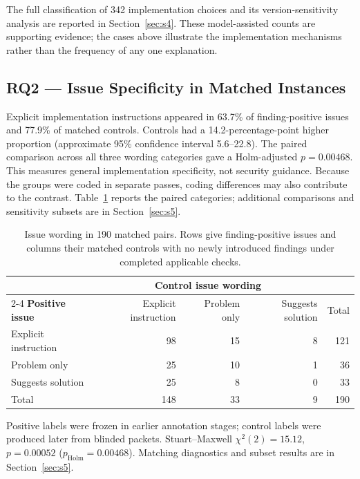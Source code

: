 \documentclass[acmsmall,screen,nonacm]{acmart}
\begin{document}
The full classification of 342 implementation choices and its version-sensitivity analysis are reported in Section~\ref{sec:s4}. These model-assisted counts are supporting evidence; the cases above illustrate the implementation mechanisms rather than the frequency of any one explanation.

\subsection{RQ2 --- Issue Specificity in Matched Instances}\label{sec:rq2-res}

Explicit implementation instructions appeared in 63.7\% of finding-positive issues and 77.9\% of matched controls. Controls had a 14.2-percentage-point higher proportion (approximate 95\% confidence interval 5.6--22.8). The paired comparison across all three wording categories gave a Holm-adjusted $p=0.00468$. This measures general implementation specificity, not security guidance. Because the groups were coded in separate passes, coding differences may also contribute to the contrast. Table~\ref{tab:rq2} reports the paired categories; additional comparisons and sensitivity subsets are in Section~\ref{sec:s5}.

\begin{table}[H]
\caption{Issue wording in 190 matched pairs. Rows give finding-positive issues and columns their matched controls with no newly introduced findings under completed applicable checks.}
\label{tab:rq2}
\small
\begin{tabular}{@{}lrrrr@{}}
\toprule
& \multicolumn{3}{c}{\textbf{Control issue wording}} & \\
\cmidrule(lr){2-4}
\textbf{Positive issue} & Explicit instruction & Problem only & Suggests solution & Total\\
\midrule
Explicit instruction & 98 & 15 & 8 & 121\\
Problem only & 25 & 10 & 1 & 36\\
Suggests solution & 25 & 8 & 0 & 33\\
\midrule
Total & 148 & 33 & 9 & 190\\
\bottomrule
\end{tabular}
\par\smallskip\raggedright\footnotesize Positive labels were frozen in earlier annotation stages; control labels were produced later from blinded packets. Stuart--Maxwell $\chi^2(2)=15.12$, $p=0.00052$ ($p_{\mathrm{Holm}}=0.00468$). Matching diagnostics and subset results are in Section~\ref{sec:s5}.
\end{table}
\end{document}

